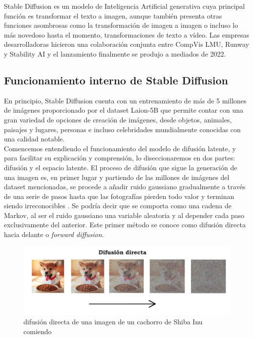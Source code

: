 Stable Diffusion es un modelo de Inteligencia Artificial generativa cuya principal función es transformar el texto a imagen, aunque también presenta otras funciones asombrosas como la transformación de imagen a imagen o incluso lo más novedoso hasta el momento, transformaciones de texto a vídeo. Las empresas desarrolladoras hicieron una colaboración conjunta entre CompVis LMU, Runway y Stability AI y el lanzamiento finalmente se produjo a mediados de 2022. \\


\subsection{Funcionamiento interno de Stable Diffusion}

En principio, Stable Diffusion cuenta con un entrenamiento de más de 5 millones de imágenes proporcionado por el dataset Laion-5B que permite contar con una gran variedad de opciones de creación de imágenes, desde objetos, animales, paisajes y lugares, personas e incluso celebridades mundialmente conocidas con una calidad notable.\\ 

Comencemos entendiendo el funcionamiento del modelo de difusión latente, y para facilitar su explicación y comprensión,  lo diseccionaremos en dos partes: difusión y el espacio latente. El proceso de difusión que sigue la generación de una imagen es, en primer lugar y partiendo de las millones de imágenes del dataset mencionadas, se procede a añadir ruido gaussiano gradualmente a través de una serie de pasos hasta que las fotografías pierden todo valor y terminan siendo irreconocibles \citep{SDW2024}. Se podría decir que se comporta como una cadena de Markov, al ser el ruido gaussiano una variable aleatoria y al depender cada paso exclusivamente del anterior. Este primer método se conoce como difusión directa hacia delante o \textit{forward diffusion}.\\

\begin{figure}[h]
	\centering
	\includegraphics[width = 1 \textwidth]{Imagenes/Vectorial/difusiondirecta.png}
	\caption{difusión directa de una imagen de un cachorro de Shiba Inu comiendo}
	\label{fig:difusiondirecta}
\end{figure}

